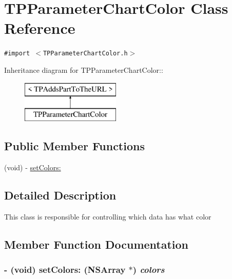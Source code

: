 \hypertarget{interface_t_p_parameter_chart_color}{
\section{TPParameterChartColor Class Reference}
\label{interface_t_p_parameter_chart_color}
}
{\tt \#import $<$TPParameterChartColor.h$>$}

Inheritance diagram for TPParameterChartColor::\begin{figure}[H]
\begin{center}
\leavevmode
\includegraphics[height=2cm]{interface_t_p_parameter_chart_color}
\end{center}
\end{figure}
\subsection*{Public Member Functions}
\begin{CompactItemize}
\item 
(void) - \hyperlink{interface_t_p_parameter_chart_color_21f439b808b2f6a9495c337e740db7b8}{setColors:}
\end{CompactItemize}


\subsection{Detailed Description}
This class is responsible for controlling which data has what color 

\subsection{Member Function Documentation}
\hypertarget{interface_t_p_parameter_chart_color_21f439b808b2f6a9495c337e740db7b8}{
\subsubsection[{setColors:}]{\setlength{\rightskip}{0pt plus 5cm}- (void) setColors: (NSArray $\ast$) {\em colors}}}
\label{interface_t_p_parameter_chart_color_21f439b808b2f6a9495c337e740db7b8}


